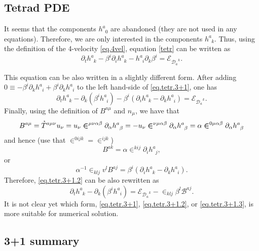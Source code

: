 \documentclass[
10pt, %
a4paper, %
oneside, %
headinclude,footinclude, %
BCOR5mm, %
]{scrartcl}
\newcommand{\pd}[1]{\partial_{#1}}
\newcommand{\tetrsymbol}{h}
\newcommand{\tetr}[2]{\tetrsymbol^{#1}_{\phantom{#1}#2}}
\newcommand{\ddT}[2]{\mathcal{D}_{#1}^{\phantom{#1}\,#2}}	%
\newcommand{\BT}[2]{B^{#1#2}}	%
\newcommand{\bbT}[2]{\mathcal{B}^{#1#2}}	%
\newcommand{\Lagtpo}{\mathcal{E}}%
\newcommand{\LCsymb}{\bm{\in}}    %
\newcommand{\HDT}[1]{\accentset{\star}{T}^{#1}}
\begin{document}
\subsection{Tetrad PDE}

It seems that the components $ \tetr{a}{0} $ are abandoned (they are not used in any equations). 
Therefore, we are only interested in the components $ \tetr{a}{k} $. Thus, using the definition of 
the 4-velocity \eqref{eq.4vel}, equation \eqref{tetr} can be written as
\begin{equation}\label{eq.tetr.3+1}
	\pd{t} \tetr{a}{k} - \beta^i \pd{i} \tetr{a}{k} - \tetr{a}{i} \pd{k} \beta^i = 
	\Lagtpo_{\ddT{a}{k}}.
\end{equation}

This equation can be also written in a slightly different form. After adding $ 0\equiv - \beta^i 
\pd{k}\tetr{a}{i} + \beta^i \pd{k}\tetr{a}{i} $ to the left hand-side of \eqref{eq.tetr.3+1}, one 
has  
\begin{equation}\label{eq.tetr.3+1.2}
	\pd{t} \tetr{a}{k} - \pd{k} (\beta^i \tetr{a}{i}) - \beta^i (\pd{i}\tetr{a}{k} - 
	\pd{k}\tetr{a}{i}) = 
	\Lagtpo_{\ddT{a}{k}}.
\end{equation}
Finally, using the definition of $ \BT{a}{\mu} $ and $ n_\mu $, we have that 
\begin{equation}
	\BT{a}{\mu} = \HDT{a\mu\nu} u_\nu = u_\nu \LCsymb^{\mu\nu\alpha\beta} 
	\pd{\alpha}\tetr{a}{\beta} = -
	u_\nu \LCsymb^{\nu\mu\alpha\beta} \pd{\alpha}\tetr{a}{\beta} =
	\alpha \LCsymb^{0\mu\alpha\beta} \pd{\alpha}\tetr{a}{\beta} 
\end{equation}
and hence (use that $ \LCsymb^{0ijk} =\LCsymb^{ijk} $)
\begin{equation}
	\BT{a}{k} =  \alpha \LCsymb^{kij}\pd{i}\tetr{a}{j},
\end{equation}
or
\begin{equation}
	\alpha^{-1}\LCsymb_{klj}v^l \BT{a}{j} = \beta^i (\pd{i}\tetr{a}{k} - \pd{k}\tetr{a}{i}).
\end{equation}
Therefore, \eqref{eq.tetr.3+1.2} can be also rewritten as 
\begin{equation}\label{eq.tetr.3+1.3}
	\pd{t} \tetr{a}{k} - \pd{k} (\beta^i \tetr{a}{i}) =  
	\Lagtpo_{\ddT{a}{k}} - \LCsymb_{klj} \beta^l \bbT{a}{j}.
\end{equation}
It is not clear yet which form, \eqref{eq.tetr.3+1}, \eqref{eq.tetr.3+1.2}, or 
\eqref{eq.tetr.3+1.3}, is more suitable for numerical solution.

\subsection{3+1 summary}
\end{document}
